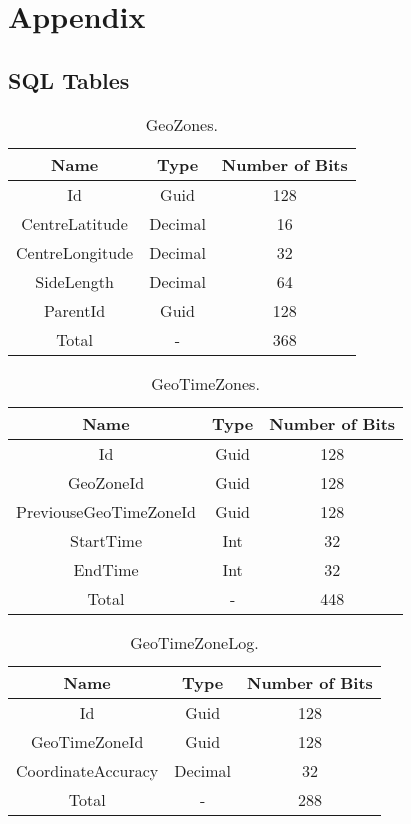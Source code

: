 \documentclass[a4paper,open right,12pt]{report}
\begin{document}
\chapter{Appendix}
\section{SQL Tables}
\begin{table}[ht]
\centering
\caption{GeoZones.}
    \begin{tabular}[t]{ccc}
    \hline
        Name & Type & Number of Bits\\
    \hline
        Id & Guid & 128 \\
        CentreLatitude & Decimal & 16 \\
        CentreLongitude & Decimal & 32 \\
        SideLength & Decimal & 64 \\
        ParentId & Guid & 128 \\
    \hline
        Total & - & 368
    \end{tabular}
\end{table}

\begin{table}[ht]
\centering
\caption{GeoTimeZones.}
    \begin{tabular}[t]{ccc}
    \hline
        Name & Type & Number of Bits\\
    \hline
        Id & Guid & 128 \\
        GeoZoneId& Guid & 128 \\
        PreviouseGeoTimeZoneId & Guid & 128 \\
        StartTime & Int & 32 \\
        EndTime & Int & 32 \\
    \hline
        Total & - & 448
    \end{tabular}
\end{table}

\begin{table}[ht]
\centering
\caption{GeoTimeZoneLog.}
    \begin{tabular}[t]{ccc}
    \hline
        Name & Type & Number of Bits\\
    \hline
        Id & Guid & 128 \\
        GeoTimeZoneId & Guid & 128 \\
        CoordinateAccuracy & Decimal & 32 \\
    \hline
        Total & - & 288
    \end{tabular}
\end{table}
\end{document}
